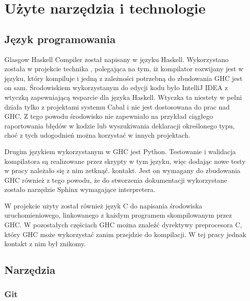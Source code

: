 \chapter{Użyte narzędzia i technologie}\label{chap:technologie}

\section{Język programowania}\label{sec:jezyk_programowania}

Glasgow Haskell Compiler został napisany w języku Haskell. Wykorzystano została
w projekcie technika , polegająca na tym, iż kompilator
rozwijany jest w języku, który kompiluje i jedną z zależności potrzebną do
zbudowania GHC jest on sam. Środowiskiem wykorzystanym do edycji kodu było
IntelliJ IDEA z wtyczką zapewniającą wsparcie dla języka Haskell. Wtyczka ta
niestety w pełni działa tylko z projektami systemu Cabal i nie jest dostosowana
do prac nad GHC. Z tego powodu środowisko nie zapewniało na przykład ciągłego
raportowania błędów w kodzie lub wyszukiwania deklaracji określonego typu, choć
z tych udogodnień można korzystać w innych projektach.

Drugim językiem wykorzystanym w GHC jest Python.
Testowanie i walidacja
kompilatora są realizowane przez skrypty w tym języku, więc dodając nowe testy w
pracy należało się z nim zetknąć. kontakt. Jest on wymagany do zbudowania GHC
również z tego powodu, że do stworzenia dokumentacji wykorzystane zostało
narzędzie Sphinx wymagające interpretera.

W projekcie użyty został również język C do napisania środowiska
uruchomieniowego, linkowanego z każdym programem skompilowanym przez GHC. W
pozostałych częściach GHC można znaleźć dyrektywy preprocesora C, który GHC może
wykorzystać zanim przejdzie do kompilacji. W tej pracy jednak kontakt z nim był
znikomy.

\section{Narzędzia}

\subsection{Git}


